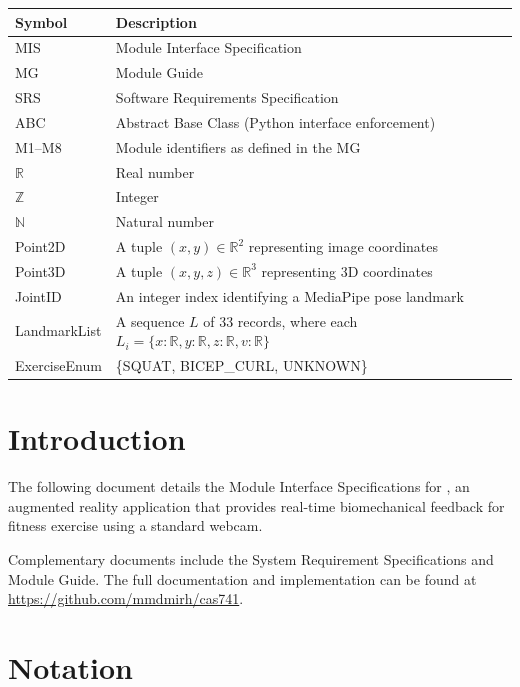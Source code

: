 \documentclass[12pt, titlepage]{article}
\begin{document}
\renewcommand{\arraystretch}{1.2}
\begin{tabular}{l l}
\toprule
\textbf{Symbol} & \textbf{Description}\\
\midrule
MIS & Module Interface Specification \\
MG  & Module Guide \\
SRS & Software Requirements Specification \\
ABC & Abstract Base Class (Python interface enforcement) \\
M1--M8 & Module identifiers as defined in the MG \\
$\mathbb{R}$ & Real number \\
$\mathbb{Z}$ & Integer \\
$\mathbb{N}$ & Natural number \\
Point2D & A tuple $(x, y) \in \mathbb{R}^2$ representing image coordinates \\
Point3D & A tuple $(x, y, z) \in \mathbb{R}^3$ representing 3D coordinates \\
JointID & An integer index identifying a MediaPipe pose landmark \\
LandmarkList & A sequence $L$ of 33 records, where each $L_i = \{x:\mathbb{R}, y:\mathbb{R}, z:\mathbb{R}, v:\mathbb{R}\}$ \\
ExerciseEnum & \{SQUAT, BICEP\_CURL, UNKNOWN\} \\
\bottomrule
\end{tabular}

\newpage

\tableofcontents

\newpage


\section{Introduction}

The following document details the Module Interface Specifications for
\progname{}, an augmented reality application that provides real-time
biomechanical feedback for fitness exercise using a standard webcam.

Complementary documents include the System Requirement Specifications
and Module Guide. The full documentation and implementation can be
found at \url{https://github.com/mmdmirh/cas741}.

\section{Notation}
\end{document}
